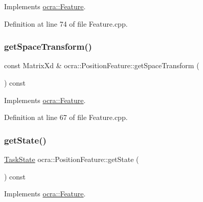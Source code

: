 Implements \hyperlink{classocra_1_1Feature_aeda4c2a5ffe638c3de30f8b91a11450e}{ocra\+::\+Feature}.



Definition at line 74 of file Feature.\+cpp.

\hypertarget{classocra_1_1PositionFeature_a5ac98c0865a46c55d30fd7ab9738245c}{}\label{classocra_1_1PositionFeature_a5ac98c0865a46c55d30fd7ab9738245c} 
\subsubsection{\texorpdfstring{get\+Space\+Transform()}{getSpaceTransform()}}
{\footnotesize\ttfamily const Matrix\+Xd \& ocra\+::\+Position\+Feature\+::get\+Space\+Transform (\begin{DoxyParamCaption}{ }\end{DoxyParamCaption}) const\hspace{0.3cm}{\ttfamily [virtual]}}



Implements \hyperlink{classocra_1_1Feature_a77eb324fb4da91fd50d0e761d2453ff3}{ocra\+::\+Feature}.



Definition at line 67 of file Feature.\+cpp.

\hypertarget{classocra_1_1PositionFeature_a4727a1538487e8194789bc8d38807ea0}{}\label{classocra_1_1PositionFeature_a4727a1538487e8194789bc8d38807ea0} 
\subsubsection{\texorpdfstring{get\+State()}{getState()}}
{\footnotesize\ttfamily \hyperlink{classocra_1_1TaskState}{Task\+State} ocra\+::\+Position\+Feature\+::get\+State (\begin{DoxyParamCaption}{ }\end{DoxyParamCaption}) const\hspace{0.3cm}{\ttfamily [virtual]}}



Implements \hyperlink{classocra_1_1Feature_a792434ceb793f25874b8fe42ae24c475}{ocra\+::\+Feature}.



